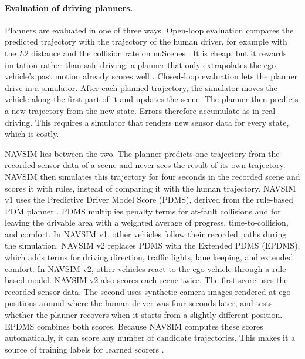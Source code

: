 \documentclass[11pt, a4paper, oneside]{book}
\begin{document}
\paragraph{Evaluation of driving planners.}
Planners are evaluated in one of three ways. Open-loop evaluation compares the predicted
trajectory with the trajectory of the human driver, for example with the $L2$ distance and the
collision rate on nuScenes \cite{nuscenes}. It is cheap, but it rewards imitation rather than
safe driving: a planner that only extrapolates the ego vehicle's past motion already scores
well \cite{pdm}. Closed-loop evaluation lets the planner drive in a simulator. After each planned trajectory,
the simulator moves the vehicle along the first part of it and updates the scene. The planner
then predicts a new trajectory from the new state. Errors therefore accumulate as in real
driving. This
requires a simulator that renders new sensor data for every state, which is costly.

NAVSIM \cite{navsim} lies between the two. The planner predicts one trajectory from the
recorded sensor data of a scene and never sees the result of its own trajectory. NAVSIM then
simulates this trajectory for four seconds in the recorded scene and scores it with rules,
instead of comparing it with the human trajectory. NAVSIM v1 \cite{navsim} uses the Predictive
Driver Model Score (PDMS), derived from the rule-based PDM planner \cite{pdm}. PDMS multiplies
penalty terms for at-fault collisions and for leaving the drivable area with a weighted average
of progress, time-to-collision, and comfort. In NAVSIM v1, other vehicles follow their recorded
paths during the simulation. NAVSIM v2 \cite{pseudosim} replaces PDMS with the Extended PDMS
(EPDMS), which adds terms for driving direction, traffic lights, lane keeping, and extended
comfort. In NAVSIM v2, other vehicles react to the ego vehicle through a rule-based model.
NAVSIM v2 also scores each scene twice. The first score uses the recorded sensor data. The
second uses synthetic camera images rendered at ego positions around where the human driver
was four seconds later, and tests whether the planner recovers when it starts from a slightly
different position. EPDMS combines both scores. Because NAVSIM computes these scores
automatically, it can score any number of candidate trajectories. This makes it a source of
training labels for learned scorers \cite{hydramdp,drivor}.
\end{document}
